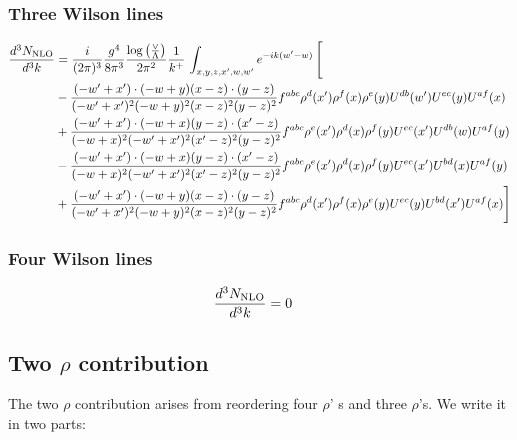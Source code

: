 \documentclass[aps,prd,amsmath,amssymb,nofootinbib]{revtex4-2}
\numberwithin{equation}{section}
\begin{document}
\subsubsection{Three Wilson lines}
\begin{align}
      \frac{d^{3}N_{\rm NLO}}{d^{3}k} & = \frac{i}{(2\pi)^{3}}\frac{g^{4}}{8\pi^{3}}\frac{\log{\left(\frac{\vee}{\Lambda}\right)}}{2\pi^{2}} \frac{1}{k^{+}}\,\int_{x,y,z,x^{\prime},w,w^{\prime}}e^{-ik(w^{\prime}-w)}\, \Bigg[\notag \\ & -  \frac{( - w' + x') \cdot ( - w + y) (x - z) \cdot (y - z)}{( - w' + x')^{2} ( - w + y)^{2} (x - z)^{2} (y - z)^{2}} f^{a b c} \rho^{d}(x') \rho^{f}(x) \rho^{e}(y) U^{d b}(w') U^{e c}(y) U^{a f}(x)\nonumber\\
    &+  \frac{( - w' + x') \cdot ( - w + x) (y - z) \cdot (x' - z)}{( - w + x)^{2} ( - w' + x')^{2} (x' - z)^{2} (y - z)^{2}} f^{a b c} \rho^{e}(x') \rho^{d}(x) \rho^{f}(y) U^{e c}(x') U^{d b}(w) U^{a f}(y)\nonumber\\
    &- \frac{( - w' + x') \cdot ( - w + x) (y - z) \cdot (x' - z)}{( - w + x)^{2} ( - w' + x')^{2} (x' - z)^{2} (y - z)^{2}} f^{a b c} \rho^{e}(x') \rho^{d}(x) \rho^{f}(y) U^{e c}(x') U^{b d}(x) U^{a f}(y)\nonumber\\
    &+  \frac{( - w' + x') \cdot ( - w + y) (x - z) \cdot (y - z)}{( - w' + x')^{2} ( - w + y)^{2} (x - z)^{2} (y - z)^{2}} f^{a b c} \rho^{d}(x') \rho^{f}(x) \rho^{e}(y) U^{e c}(y) U^{b d}(x') U^{a f}(x) \Bigg]
\end{align}
\subsubsection{Four Wilson lines}
\begin{align}
    \frac{d^{3}N_{\rm NLO}}{d^{3}k} & = 0 
\end{align}    
\subsection{Two $\rho$ contribution}
The two $\rho$ contribution arises from reordering four $\rho$' s and three $\rho$'s. We write it in two parts:
\end{document}
